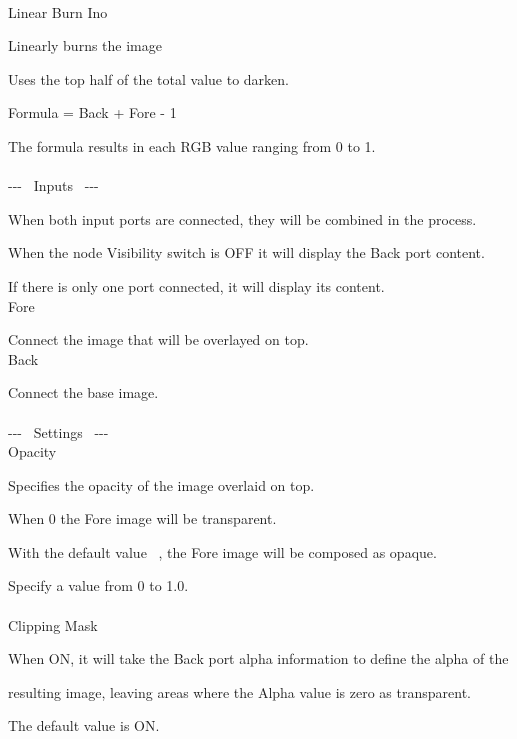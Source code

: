 \documentclass[a4paper,12pt]{article}
\begin{document}
\thispagestyle{empty}

\Large
\noindent \\
Linear Burn Ino\medskip
\par
\normalsize
Linearly burns the image\par
Uses the top half of the total value to darken.\par
Formula = Back + Fore - 1\par
The formula results in each RGB value ranging from 0 to 1.\\
\\
-{-}- \ Inputs \ -{-}-\par
When both input ports are connected, they will be combined in the process.\par
When the node Visibility switch is OFF it will display the Back port content.\par
If there is only one port connected, it will display its content.\\
Fore\par
Connect the image that will be overlayed on top.\\
Back\par
Connect the base image.\\
\\
-{-}- \ Settings \ -{-}-\\
Opacity\par
Specifies the opacity of the image overlaid on top.\par
When 0 the Fore image will be transparent.\par
With the default value \textquotedbl \ , the Fore image will be composed as opaque.\par
Specify a value from 0 to 1.0.\\
\\
Clipping Mask\par
When ON, it will take the Back port alpha information to define the alpha of the\par
resulting image, leaving areas where the Alpha value is zero as transparent.\par
The default value is ON.
\end{document}
